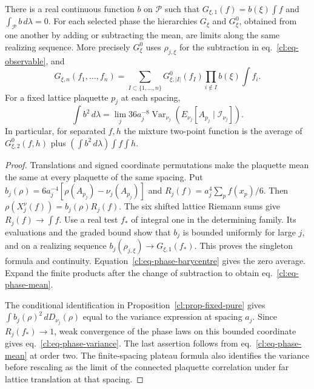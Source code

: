 \documentclass[11pt,letterpaper,reqno]{amsart}
\makeatletter
\numberwithin{equation}{section}
\renewcommand{\eqref}[1]{\textup{eq.~\ref{#1}}}
\theoremstyle{definition}
\newcommand{\ms@minorstart}{%
  \pushQED{\qed}\renewcommand{\qedsymbol}{$\blacksquare$}}
\newenvironment{proposition}[1][]{\ms@minorstart\ms@proposition[#1]}
  {\popQED\endms@proposition}
\theoremstyle{remark}
\makeatother
\begin{document}
\begin{proposition}[The mean of a phase]\label{cl:prop-phase-mean}
There is a real continuous function \(b\) on \(\mathcal P\)
such that \(G_{\xi,1}(f)=b(\xi)\int f\) and
\(\int_{\mathcal P}b\,d\lambda=0\).
For each selected phase the hierarchies \(G_\xi\) and
\(G_\xi^0\), obtained from one another by adding or subtracting
the mean, are limits along the same realizing sequence.
More precisely \(G_\xi^0\) uses \(\rho_{j,\xi}\) for the
subtraction in \eqref{cl:eq-observable}, and
\begin{equation}\label{cl:eq-phase-mean}
 G_{\xi,n}(f_1,\ldots,f_n)
  =\sum_{I\subset\{1,\ldots,n\}}G^0_{\xi,|I|}(f_I)
            \prod_{i\notin I} b(\xi)\int f_i .
\end{equation}
For a fixed lattice plaquette \(p_j\) at each spacing,
\begin{equation}\label{cl:eq-phase-variance}
 \int b^2\,d\lambda
 =\lim_j 36a_j^{-8}
     \operatorname{Var}_{\nu_j}
         (E_{\nu_j}[A_{p_j}\mid\mathcal I_{\nu_j}]).
\end{equation}
In particular, for separated \(f,h\) the mixture two-point
function is the average of \(G^0_{\xi,2}(f,h)\) plus
\((\int b^2\,d\lambda)\int f\int h\).
\end{proposition}

\begin{proof}
Translations and signed coordinate permutations make
the plaquette mean the same at every plaquette of the
same spacing. Put
\(b_j(\rho)=6a_j^{-4}[\rho(A_{p_j})-\nu_j(A_{p_j})]\)
and \(R_j(f)=a_j^4\sum_p f(x_p)/6\).
Then \(\rho(X_j^\nu(f))=b_j(\rho)R_j(f)\).
The six shifted lattice Riemann sums give
\(R_j(f)\to\int f\). Use a real test \(f_*\) of integral
one in the determining family. Its evaluations and the
graded bound show that \(b_j\) is bounded uniformly for
large \(j\), and on a realizing sequence
\(b_j(\rho_{j,\xi})\to G_{\xi,1}(f_*)\).
This proves the singleton formula and continuity.
Equation~\ref{cl:eq-phase-barycentre} gives the zero
average. Expand the finite products after the change
of subtraction to obtain \eqref{cl:eq-phase-mean}.

The conditional identification in
Proposition~\ref{cl:prop-fixed-pure} gives
\(\int b_j(\rho)^2\,dD_{\nu_j}(\rho)\) equal to the
variance expression at spacing \(a_j\). Since
\(R_j(f_*)\to1\), weak convergence of the phase laws
on this bounded coordinate gives \eqref{cl:eq-phase-variance}.
The last assertion follows from \eqref{cl:eq-phase-mean}
at order two. The finite-spacing plateau formula also
identifies the variance before rescaling as the limit
of the connected plaquette correlation under far lattice
translation at that spacing.
\end{proof}
\end{document}
